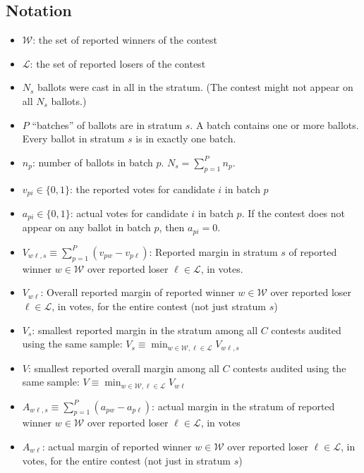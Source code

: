 \subsection{Notation}
\begin{itemize}
    \item  $\mathcal{W}$: the set of reported winners of the contest
    \item  $\mathcal{L}$: the set of reported losers of the contest
    \item  $N_s$ ballots were cast in all in the stratum. (The contest might not appear on all $N_s$ ballots.)
    \item  $P$ ``batches'' of ballots are in stratum $s$. A batch contains one or more ballots. Every ballot in stratum $s$ is in exactly one batch.
    \item  $n_p$: number of ballots in batch $p$. $N_s = \sum_{p=1}^P n_p$.
    \item  $v_{pi} \in \{0, 1\}$: the reported votes for candidate $i$ in batch $p$
    \item  $a_{pi} \in \{0, 1\}$: actual votes for candidate $i$ in batch $p$. 
                  If the contest does not appear on any ballot in batch $p$, then $a_{pi} = 0$.
                  
    \item  $V_{w\ell,s} \equiv \sum_{p=1}^P (v_{pw} - v_{p\ell})$: 
Reported margin in stratum $s$ of reported winner $w \in \mathcal{W}$ over reported loser 
$\ell \in \mathcal{L}$, in votes.

    \item  $V_{w\ell}$: 
Overall reported margin of reported winner $w \in \mathcal{W}$ over reported loser 
$\ell \in \mathcal{L}$, in votes, for the entire contest (not just stratum $s$)

    \item  $V_s$: smallest reported margin in the stratum among all $C$ contests audited using the same sample:
$V_s \equiv \min_{w \in \mathcal{W}, \ell \in \mathcal{L}} V_{w \ell, s}$

   \item  $V$: smallest reported overall margin among all $C$ contests audited using the same sample:
$V \equiv \min_{w \in \mathcal{W}, \ell \in \mathcal{L}} V_{w \ell}$

    \item  $A_{w\ell,s} \equiv \sum_{p=1}^P (a_{pw} - a_{p\ell})$: 
actual margin in the stratum of reported winner $w \in \mathcal{W}$ over reported loser 
$\ell \in \mathcal{L}$, in votes

    \item  $A_{w\ell}$: 
actual margin of reported winner $w \in \mathcal{W}$ over reported loser 
$\ell \in \mathcal{L}$, in votes, for the entire contest (not just in stratum $s$)

\end{itemize}


